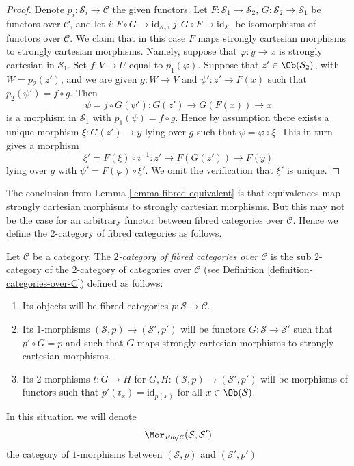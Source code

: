 \begin{proof}
Denote $p_i : \mathcal{S}_i \to \mathcal{C}$ the given functors.
Let $F : \mathcal{S}_1 \to \mathcal{S}_2$,
$G : \mathcal{S}_2 \to \mathcal{S}_1$ be functors over $\mathcal{C}$, and let
$i : F \circ G \to \text{id}_{\mathcal{S}_2}$,
$j : G \circ F \to \text{id}_{\mathcal{S}_1}$ be isomorphisms of
functors over $\mathcal{C}$.
We claim that in this case $F$ maps strongly cartesian morphisms
to strongly cartesian morphisms. Namely, suppose that
$\varphi : y \to x$ is strongly cartesian in $\mathcal{S}_1$.
Set $f : V \to U$ equal to $p_1(\varphi)$. Suppose that
$z' \in \Ob(\mathcal{S}_2)$, with $W = p_2(z')$, and we are given
$g : W \to V$ and $\psi' : z' \to F(x)$ such that
$p_2(\psi') = f \circ g$. Then
$$
\psi = j \circ G(\psi') : G(z') \to G(F(x)) \to x
$$
is a morphism in $\mathcal{S}_1$ with $p_1(\psi) = f \circ g$.
Hence by assumption there exists a unique morphism $\xi : G(z') \to y$
lying over $g$ such that $\psi = \varphi \circ \xi$. This in turn gives a
morphism
$$
\xi' = F(\xi) \circ i^{-1} : z' \to F(G(z')) \to F(y)
$$
lying over $g$ with $\psi' = F(\varphi) \circ \xi'$. We omit the verification
that $\xi'$ is unique.
\end{proof}

\noindent
The conclusion from Lemma \ref{lemma-fibred-equivalent} is that
equivalences map strongly cartesian morphisms to strongly cartesian
morphisms. But this may not be the case for an arbitrary functor between
fibred categories over $\mathcal{C}$. Hence we define the $2$-category
of fibred categories as follows.

\begin{definition}
\label{definition-fibred-categories-over-C}
Let $\mathcal{C}$ be a category.
The {\it $2$-category of fibred categories over $\mathcal{C}$}
is the sub $2$-category of the $2$-category of categories
over $\mathcal{C}$ (see Definition \ref{definition-categories-over-C})
defined as follows:
\begin{enumerate}
\item Its objects will be fibred categories
$p : \mathcal{S} \to \mathcal{C}$.
\item Its $1$-morphisms $(\mathcal{S}, p) \to (\mathcal{S}', p')$
will be functors $G : \mathcal{S} \to \mathcal{S}'$ such that
$p' \circ G = p$ and such that $G$ maps strongly cartesian
morphisms to strongly cartesian morphisms.
\item Its $2$-morphisms $t : G \to H$ for
$G, H : (\mathcal{S}, p) \to (\mathcal{S}', p')$
will be morphisms of functors
such that $p'(t_x) = \text{id}_{p(x)}$
for all $x \in \Ob(\mathcal{S})$.
\end{enumerate}
In this situation we will denote
$$
\Mor_{\textit{Fib}/\mathcal{C}}(\mathcal{S}, \mathcal{S}')
$$
the category of $1$-morphisms between
$(\mathcal{S}, p)$ and $(\mathcal{S}', p')$
\end{definition}

